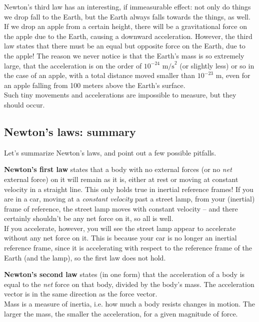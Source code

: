 \documentclass[12pt,a4paper]{report}
\begin{document}
Newton's third law has an interesting, if immeasurable effect: not only do things we drop fall to the Earth, but the Earth always falls towards the things, as well. If we drop an apple from a certain height, there will be a gravitational force on the apple due to the Earth, causing a downward acceleration. However, the third law states that there must be an equal but opposite force on the Earth, due to the apple! The reason we never notice is that the Earth's mass is so extremely large, that the acceleration is on the order of $10^{-24} \text{ m/s}^2$ (or slightly less) or so in the case of an apple, with a total distance moved smaller than $10^{-23}$ m, even for an apple falling from 100 meters above the Earth's surface.\\
Such tiny movements and accelerations are impossible to measure, but they should occur.


\subsection{Newton's laws: summary}

Let's summarize Newton's laws, and point out a few possible pitfalls.

\textbf{Newton's first law} states that a body with no external forces (or no \emph{net} external force) on it will remain as it is, either at rest or moving at constant velocity in a straight line. This only holds true in inertial reference frames! If you are in a car, moving at a \emph{constant velocity} past a street lamp, from your (inertial) frame of reference, the street lamp moves with constant velocity -- and there certainly shouldn't be any net force on it, so all is well.\\
If you accelerate, however, you will see the street lamp appear to accelerate without any net force on it. This is because your car is no longer an inertial reference frame, since it is accelerating with respect to the reference frame of the Earth (and the lamp), so the first law does not hold.

\textbf{Newton's second law} states (in one form) that the acceleration of a body is equal to the \emph{net} force on that body, divided by the body's mass. The acceleration vector is in the same direction as the force vector.\\
Mass is a measure of inertia, i.e. how much a body resists changes in motion. The larger the mass, the smaller the acceleration, for a given magnitude of force.
\end{document}
